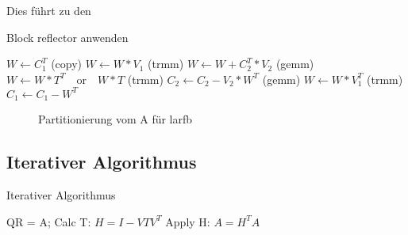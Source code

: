 Dies führt zu den
\begin{algorithm}[H]
	\caption{Block reflector anwenden}
	\label{alg:applyblockref}
	\begin{algorithmic}
		\State 	$W \leftarrow C_1^T$ (copy)
		\State	$W \leftarrow W * V_1 $ (trmm)
			\State $W \leftarrow W + C_2^T*V_2$ (gemm)
		\EndIf
		\State 	$ W \leftarrow W * T^T \quad \text{or}\quad  W * T$ (trmm)
			\State $C_2 \leftarrow C_2 - V_2 * W^T$ (gemm)
		\EndIf
		\State 	$ W \leftarrow W * V_1^T $ (trmm)
		\State 	$ C_1 \leftarrow C_1 - W^T $
	\end{algorithmic}
\end{algorithm}


\begin{figure} [H]
	\centering
	
	\caption{Partitionierung vom A für larfb}
	\label{fig:patrA}
\end{figure}


\subsection{Iterativer Algorithmus}
\begin{algorithm}[H]
	\caption{Iterativer Algorithmus}
	\label{alg::italg}
	\begin{algorithmic}
		\For {i = 0 : n}
			\State QR = A;
			\If {i + ib > n}
				\State Calc T: $H=I-VTV^T$
				\State Apply H: $A=H^TA$
			\EndIf
		\EndFor
	\end{algorithmic}
\end{algorithm}
